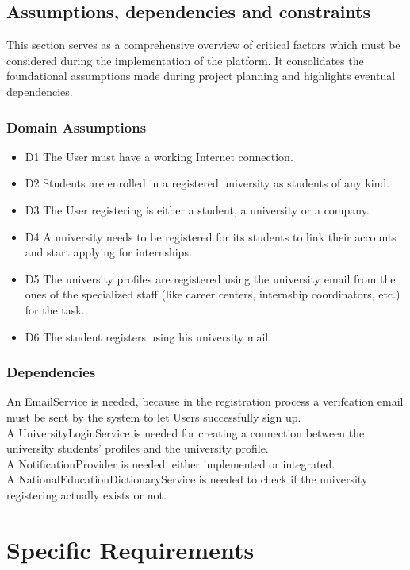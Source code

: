 \documentclass{article}
\begin{document}
\subsection{Assumptions, dependencies and constraints}
This section serves as a comprehensive overview of critical factors which must be considered during the implementation of the platform. It consolidates the foundational assumptions made during project planning and highlights eventual dependencies.
\subsubsection{Domain Assumptions}
    \begin{itemize}
        \item D1 The User must have a working Internet connection.
        \item D2 Students are enrolled in a registered university as students of any kind.
        \item D3 The User registering is either a student, a university or a company.
        \item D4 A university needs to be registered for its students to link their accounts and start applying for internships.
        \item D5 The university profiles are registered using the university email from the ones of the specialized staff (like career centers, internship coordinators, etc.) for the task.
        \item D6 The student registers using his university mail.

    \end{itemize}
\subsubsection{Dependencies}
An EmailService is needed, because in the registration process a verifcation email must be sent by the system to let Users successfully sign up.
\\A UniversityLoginService is needed for creating a connection between the university students' profiles and the university profile.
\\A NotificationProvider is needed, either implemented or integrated.
\\A NationalEducationDictionaryService is needed to check if the university registering actually exists or not.

\section{Specific Requirements}
\end{document}
